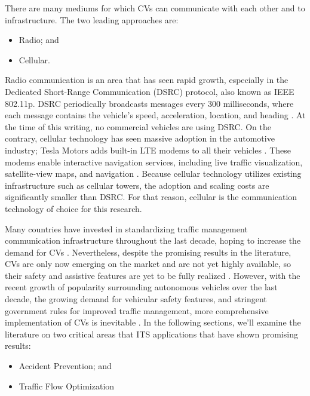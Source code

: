 There are many mediums for which CVs can communicate with each other and to infrastructure. The two leading approaches are:
\begin{itemize}
	\item Radio; and

	\item Cellular.
\end{itemize}

Radio communication is an area that has seen rapid growth, especially in the Dedicated Short-Range Communication (\acrshort{DSRC}) protocol, also known as IEEE 802.11p. \acrshort{DSRC} periodically broadcasts messages every 300 milliseconds, where each message contains the vehicle's speed, acceleration, location, and heading \cite{Hafeez2013, Khare2020}. At the time of this writing, no commercial vehicles are using \acrshort{DSRC}. On the contrary, cellular technology has seen massive adoption in the automotive industry; Tesla Motors adds built-in LTE modems to all their vehicles \cite{Orange-Telsa2014, TelsaConnectivity2021}. These modems enable interactive navigation services, including live traffic visualization, satellite-view maps, and navigation \cite{Orange-Telsa2014, TelsaConnectivity2021}. Because cellular technology utilizes existing infrastructure such as cellular towers, the adoption and scaling costs are significantly smaller than \acrshort{DSRC}. For that reason, cellular is the communication technology of choice for this research.

Many countries have invested in standardizing traffic management communication infrastructure throughout the last decade, hoping to increase the demand for CVs \cite{Huang2009}. Nevertheless, despite the promising results in the literature, CVs are only now emerging on the market and are not yet highly available, so their safety and assistive features are yet to be fully realized \cite{Bahaaldin2017, Ahmed2017}. However, with the recent growth of popularity surrounding autonomous vehicles over the last decade, the growing demand for vehicular safety features, and stringent government rules for improved traffic management, more comprehensive implementation of CVs is inevitable \cite{Sukru2020, Global-V2X-Market2020, Lyu2020}. In the following sections, we'll examine the literature on two critical areas that \acrshort{ITS} applications that have shown promising results:
\begin{itemize}
	\item Accident Prevention; and

	\item Traffic Flow Optimization
\end{itemize}

